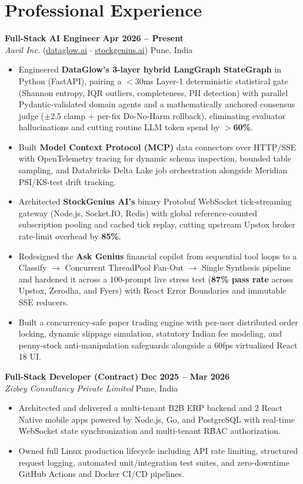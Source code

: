 \documentclass[a4paper,9pt]{article}
\begin{document}
\section*{Professional Experience}

\textbf{Full-Stack AI Engineer} \hfill \textbf{Apr 2026 -- Present} \\
\textit{Aavil Inc.} (\href{https://dataglow.ai}{dataglow.ai} $\cdot$ \href{https://stockgenius.ai}{stockgenius.ai}) \hfill Pune, India
\begin{itemize}
    \item Engineered \textbf{DataGlow's 3-layer hybrid LangGraph StateGraph} in Python (FastAPI), pairing a $<$30ms Layer-1 deterministic statistical gate (Shannon entropy, IQR outliers, completeness, PII detection) with parallel Pydantic-validated domain agents and a mathematically anchored consensus judge ($\pm$2.5 clamp + per-fix Do-No-Harm rollback), eliminating evaluator hallucinations and cutting routine LLM token spend by \textbf{$>$60\%}.
    \item Built \textbf{Model Context Protocol (MCP)} data connectors over HTTP/SSE with OpenTelemetry tracing for dynamic schema inspection, bounded table sampling, and Databricks Delta Lake job orchestration alongside Meridian PSI/KS-test drift tracking.
    \item Architected \textbf{StockGenius AI's} binary Protobuf WebSocket tick-streaming gateway (Node.js, Socket.IO, Redis) with global reference-counted subscription pooling and cached tick replay, cutting upstream Upstox broker rate-limit overhead by \textbf{85\%}.
    \item Redesigned the \textbf{Ask Genius} financial copilot from sequential tool loops to a Classify $\rightarrow$ Concurrent ThreadPool Fan-Out $\rightarrow$ Single Synthesis pipeline and hardened it across a 100-prompt live stress test (\textbf{87\% pass rate} across Upstox, Zerodha, and Fyers) with React Error Boundaries and immutable SSE reducers.
    \item Built a concurrency-safe paper trading engine with per-user distributed order locking, dynamic slippage simulation, statutory Indian fee modeling, and penny-stock anti-manipulation safeguards alongside a 60fps virtualized React 18 UI.
\end{itemize}

\vspace{2pt}
\textbf{Full-Stack Developer (Contract)} \hfill \textbf{Dec 2025 -- Mar 2026} \\
\textit{Zizbey Consultancy Private Limited} \hfill Pune, India
\begin{itemize}
    \item Architected and delivered a multi-tenant B2B ERP backend and 2 React Native mobile apps powered by Node.js, Go, and PostgreSQL with real-time WebSocket state synchronization and multi-tenant RBAC authorization.
    \item Owned full Linux production lifecycle including API rate limiting, structured request logging, automated unit/integration test suites, and zero-downtime GitHub Actions and Docker CI/CD pipelines.
\end{itemize}
\end{document}
